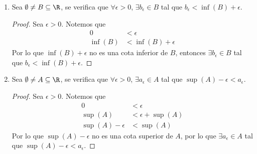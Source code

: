 \begin{enumerate}[label=\alph*)]
  \begin{proof}\leavevmode
    \begin{enumerate}[label=\roman*)]
      \item Sea $x\in A$. Se tiene que $x\in B$, y por definición, $\inf (B) \leq x$, por lo que $\inf (B)$ es cota inferior de $A$. Por definición, el ínfimo de $A$ es mayor o igual que todas sus cotas inferiores, es decir, $\inf (B) \leq \inf (A)$.
      \item Sea $x\in A$. Por definición, $\inf (A) \leq x \leq \sup (A)$, por lo que $\inf (A) \leq \sup (A)$. (El ínfimo es menor o igual que el supremo).
      \item Sea $x\in A$. Se tiene que $x\in B$, y por definición, $x\leq \sup (B)$, por lo que $\sup (B)$ es cota superior de $A$, y por definición, el supremo de $A$ es menor o igual que todas sus cotas superiores, es decir, $\sup (A) \leq \sup (B)$. \qedhere
    \end{enumerate}
  \end{proof}
  
  \begin{enumerate}[label=\roman*)]
  \item $\inf (B) \leq \sup (A)$.
  \item $\inf (A) \leq \sup (B)$.
  \end{enumerate}
  \item Sea $\emptyset \neq B\subseteq \R$, se verifica que $\forall \epsilon > 0$, $\exists b_\epsilon\in B$ tal que $b_\epsilon < \inf (B) + \epsilon$.
  
  \begin{proof}\leavevmode
    Sea $\epsilon >0$. Notemos que
    \begin{align*}
      0 &< \epsilon\\
      \inf (B) &< \inf (B) + \epsilon
    \end{align*}
    Por lo que $\inf (B) +\epsilon$ no es una cota inferior de $B$, entonces $\exists b_\epsilon\in B$ tal que $b_\epsilon < \inf (B) + \epsilon$.
  \end{proof}
  
  \item Sea $\emptyset \neq A\subseteq \R$, se verifica que $\forall \epsilon > 0$, $\exists a_\epsilon\in A$ tal que $\sup (A) - \epsilon < a_\epsilon$.
  \begin{proof}\leavevmode
    Sea $\epsilon>0$. Notemos que 
    \begin{align*}
      0 &< \epsilon\\
      \sup (A) &< \epsilon + \sup (A)\\
      \sup (A) - \epsilon &< \sup (A)
    \end{align*}
    Por lo que $\sup (A)-\epsilon$ no es una cota superior de $A$, por lo que $\exists a_\epsilon\in A$ tal que $\sup (A) - \epsilon < a_\epsilon$.
  \end{proof}
  

\end{enumerate}
